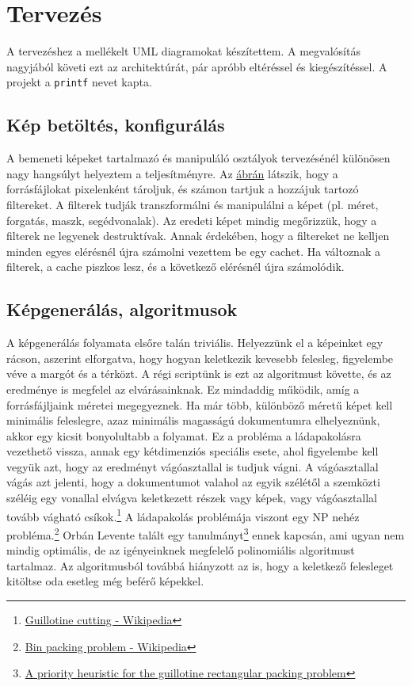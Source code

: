 \chapter{Tervezés}

A tervezéshez a mellékelt UML diagramokat készítettem. A megvalósítás nagyjából követi ezt az architektúrát, pár apróbb eltéréssel és kiegészítéssel.
A projekt a \texttt{printf} nevet kapta.

\section{Kép betöltés, konfigurálás}

A bemeneti képeket tartalmazó és manipuláló osztályok tervezésénél különösen nagy hangsúlyt helyeztem a teljesítményre. Az \href{fig:ImageSource_uml}{ábrán} látszik, hogy a forrásfájlokat pixelenként tároljuk, és számon tartjuk a hozzájuk tartozó filtereket. A filterek tudják transzformálni és manipulálni a képet (pl. méret, forgatás, maszk, segédvonalak). Az eredeti képet mindig megőrizzük, hogy a filterek ne legyenek destruktívak. Annak érdekében, hogy a filtereket ne kelljen minden egyes elérésnél újra számolni vezettem be egy cachet. Ha változnak a filterek, a cache piszkos lesz, és a következő elérésnél újra számolódik.

\section{Képgenerálás, algoritmusok}

A képgenerálás folyamata elsőre talán triviális. Helyezzünk el a képeinket egy rácson, aszerint elforgatva, hogy hogyan keletkezik kevesebb felesleg, figyelembe véve a margót és a térközt. A régi scriptünk is ezt az algoritmust követte, és az eredménye is megfelel az elvárásainknak. Ez mindaddig működik, amíg a forrásfájljaink méretei megegyeznek. Ha már több, különböző méretű képet kell minimális feleslegre, azaz minimális magasságú dokumentumra elhelyeznünk, akkor egy kicsit bonyolultabb a folyamat. Ez a probléma a ládapakolásra vezethető vissza, annak egy kétdimenziós speciális esete, ahol figyelembe kell vegyük azt, hogy az eredményt vágóasztallal is tudjuk vágni. A vágóasztallal vágás azt jelenti, hogy a dokumentumot valahol az egyik szélétől a szemközti széléig egy vonallal elvágva keletkezett részek vagy képek, vagy vágóasztallal tovább vágható csíkok.\footnote{\href{https://en.wikipedia.org/wiki/Guillotine_cutting}{Guillotine cutting - Wikipedia}} A ládapakolás problémája viszont egy NP nehéz probléma.\footnote{\href{https://en.wikipedia.org/wiki/Bin_packing_problem}{Bin packing problem - Wikipedia}} Orbán Levente talált egy tanulmányt\footnote{\href{https://sci-hub.se/10.1016/j.ipl.2015.08.008}{A priority heuristic for the guillotine rectangular packing problem}} ennek kapcsán, ami ugyan nem mindig optimális, de az igényeinknek megfelelő polinomiális algoritmust tartalmaz. Az algoritmusból továbbá hiányzott az is, hogy a keletkező felesleget kitöltse oda esetleg még beférő képekkel.

